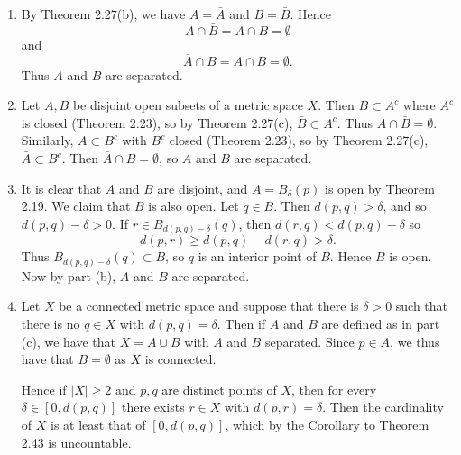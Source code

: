 \begin{ex}
\begin{enumerate}
\item By Theorem 2.27(b), we have $A = \bar{A}$ and $B = \bar{B}$. Hence \[A\cap\bar{B} = A\cap B = \emptyset\] and \[\bar{A}\cap B = A\cap B = \emptyset.\] Thus $A$ and $B$ are separated.

\item Let $A, B$ be disjoint open subsets of a metric space $X$. Then $B \subset A^c$ where $A^c$ is closed (Theorem 2.23), so by Theorem 2.27(c), $\bar{B} \subset A^c$. Thus $A\cap\bar{B} = \emptyset$. Similarly, $A \subset B^c$ with $B^c$ closed (Theorem 2.23), so by Theorem 2.27(c), $\bar{A} \subset B^c$. Then $\bar{A}\cap B = \emptyset$, so $A$ and $B$ are separated.

\item It is clear that $A$ and $B$ are disjoint, and $A = B_{\delta}(p)$ is open by Theorem 2.19. We claim that $B$ is also open. Let $q \in B$. Then $d(p, q) > \delta$, and so $d(p, q) - \delta > 0$. If $r \in B_{d(p, q) - \delta}(q)$, then $d(r, q) < d(p, q) - \delta$ so \[d(p, r) \geq d(p, q) - d(r, q) > \delta.\] Thus $B_{d(p, q) - \delta}(q) \subset B$, so $q$ is an interior point of $B$. Hence $B$ is open. Now by part (b), $A$ and $B$ are separated.

\item Let $X$ be a connected metric space and suppose that there is $\delta > 0$ such that there is no $q \in X$ with $d(p, q) = \delta$. Then if $A$ and $B$ are defined as in part (c), we have that $X = A\cup B$ with $A$ and $B$ separated. Since $p \in A$, we thus have that $B = \emptyset$ as $X$ is connected.

Hence if $|X| \geq 2$ and $p, q$ are distinct points of $X$, then for every $\delta \in [0, d(p, q)]$ there exists $r \in X$ with $d(p, r) = \delta$. Then the cardinality of $X$ is at least that of $[0, d(p, q)]$, which by the Corollary to Theorem 2.43 is uncountable.
\end{enumerate}
\end{ex}

\begin{ex}
[TODO]
\end{ex}

\begin{ex}

\end{ex}

